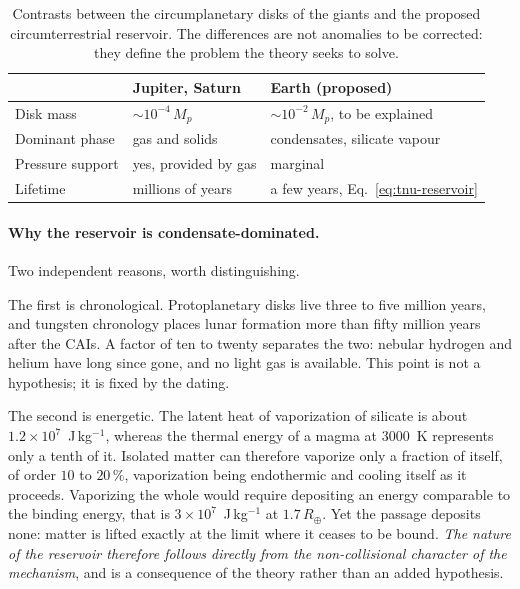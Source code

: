 \documentclass[11pt,a4paper,openany]{report}
\newcommand{\Rt}{R_{\oplus}}
\begin{document}
\begin{table}[htbp]
\centering
\small
\caption{Contrasts between the circumplanetary disks of the giants and the proposed
circumterrestrial reservoir. The differences are not anomalies to be corrected: they define the
problem the theory seeks to solve.}
\label{tab:contraste-disques}
\begin{tabularx}{\textwidth}{>{\raggedright\arraybackslash}p{4.2cm}
>{\raggedright\arraybackslash}X >{\raggedright\arraybackslash}X}
\toprule
 & \textbf{Jupiter, Saturn} & \textbf{Earth (proposed)} \\
\midrule
Disk mass & $\sim10^{-4}\,M_p$ & $\sim10^{-2}\,M_p$, to be explained \\[3pt]
Dominant phase & gas and solids & condensates, silicate vapour \\[3pt]
Pressure support & yes, provided by gas & marginal \\[3pt]
Lifetime & millions of years & a few years, Eq.~\eqref{eq:tnu-reservoir} \\
\bottomrule
\end{tabularx}
\end{table}


\paragraph{Why the reservoir is condensate-dominated.} Two independent reasons, worth
distinguishing.

The first is chronological. Protoplanetary disks live three to five million years, and tungsten
chronology places lunar formation more than fifty million years after the CAIs. A factor of ten to
twenty separates the two: nebular hydrogen and helium have long since gone, and no light gas is
available. This point is not a hypothesis; it is fixed by the dating.

The second is energetic. The latent heat of vaporization of silicate is about
$1.2\times10^{7}$~J\,kg$^{-1}$, whereas the thermal energy of a magma at $3000$~K represents only a
tenth of it. Isolated matter can therefore vaporize only a fraction of itself, of order $10$ to
$20\,\%$, vaporization being endothermic and cooling itself as it proceeds. Vaporizing the whole
would require depositing an energy comparable to the binding energy, that is
$3\times10^{7}$~J\,kg$^{-1}$ at $1.7\,\Rt$. Yet the passage deposits none: matter is lifted exactly
at the limit where it ceases to be bound. \emph{The nature of the reservoir therefore follows
directly from the non-collisional character of the mechanism}, and is a consequence of the theory
rather than an added hypothesis.
\end{document}
